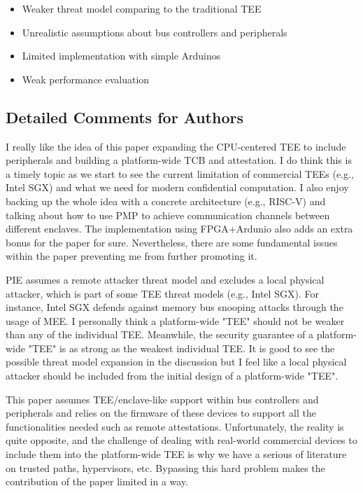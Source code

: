 \documentclass[9pt]{article}
\begin{document}
\begin{itemize}

\item
  Weaker threat model comparing to the traditional TEE
\item
  Unrealistic assumptions about bus controllers and peripherals
\item
  Limited implementation with simple Arduinos
\item
  Weak performance evaluation
\end{itemize}

\subsection{Detailed Comments for Authors}

I really like the idea of this paper expanding the CPU-centered TEE to
include peripherals and building a platform-wide TCB and attestation. I
do think this is a timely topic as we start to see the current
limitation of commercial TEEs (e.g., Intel SGX) and what we need for
modern confidential computation. I also enjoy backing up the whole idea
with a concrete architecture (e.g., RISC-V) and talking about how to use
PMP to achieve communication channels between different enclaves. The
implementation using FPGA+Ardunio also adds an extra bonus for the paper
for sure. Nevertheless, there are some fundamental issues within the
paper preventing me from further promoting it.

PIE assumes a remote attacker threat model and excludes a local physical
attacker, which is part of some TEE threat models (e.g., Intel SGX). For
instance, Intel SGX defends against memory bus snooping attacks through
the usage of MEE. I personally think a platform-wide "TEE" should not be
weaker than any of the individual TEE. Meanwhile, the security guarantee
of a platform-wide "TEE" is as strong as the weakest individual TEE. It
is good to see the possible threat model expansion in the discussion but
I feel like a local physical attacker should be included from the
initial design of a platform-wide "TEE".

This paper assumes TEE/enclave-like support within bus controllers and
peripherals and relies on the firmware of these devices to support all
the functionalities needed such as remote attestations. Unfortunately,
the reality is quite opposite, and the challenge of dealing with
real-world commercial devices to include them into the platform-wide TEE
is why we have a serious of literature on trusted paths, hypervisors,
etc. Bypassing this hard problem makes the contribution of the paper
limited in a way.
\end{document}
